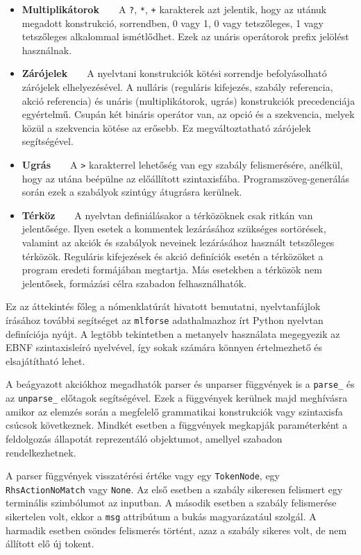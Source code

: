\documentclass[twoside, 12pt]{report}
\begin{document}
\begin{itemize}[noitemsep]
  \item \textbf{Multiplikátorok}\ \ \ \ A \verb|?|, \verb|*|, \verb|+| karakterek azt jelentik, hogy az utánuk megadott konstrukció, sorrendben, 0 vagy 1, 0 vagy tetszőleges, 1 vagy tetszőleges alkalommal ismétlődhet. Ezek az unáris operátorok prefix jelölést használnak.
  \item \textbf{Zárójelek}\ \ \ \ A nyelvtani konstrukciók kötési sorrendje befolyásolható zárójelek elhelyezésével. A nulláris (reguláris kifejezés, szabály referencia, akció referencia) és unáris (multiplikátorok, ugrás) konstrukciók precedenciája egyértelmű. Csupán két bináris operátor van, az opció és a szekvencia, melyek közül a szekvencia kötése az erősebb. Ez megváltoztatható zárójelek segítségével.
  \item \textbf{Ugrás}\ \ \ \ A \verb|>| karakterrel lehetőség van egy szabály felismerésére, anélkül, hogy az utána beépülne az előállított szintaxisfába. Programszöveg-generálás során ezek a szabályok szintúgy átugrásra kerülnek.
  \item \textbf{Térköz}\ \ \ \ A nyelvtan definiálásakor a térközöknek csak ritkán van jelentősége. Ilyen esetek a kommentek lezárásához szükséges sortörések, valamint az akciók és szabályok neveinek lezárásához használt tetszőleges térközök. Reguláris kifejezések és akció definíciók esetén a térközöket a program eredeti formájában megtartja. Más esetekben a térközök nem jelentősek, formázási célra szabadon felhasználhatók.
\end{itemize}

Ez az áttekintés főleg a nómenklatúrát hivatott bemutatni, nyelvtanfájlok írásához további segítséget az \verb|mlforse| adathalmazhoz írt Python nyelvtan definíciója nyújt. A legtöbb tekintetben a metanyelv használata megegyezik az EBNF szintaxisleíró nyelvével, így sokak számára könnyen értelmezhető és elsajátítható lehet.

A beágyazott akciókhoz megadhatók parser és unparser függvények is a \verb|parse_| és az \verb|unparse_| előtagok segítségével. Ezek a függvények kerülnek majd meghívásra amikor az elemzés során a megfelelő grammatikai konstrukciók vagy szintaxisfa csúcsok következnek. Mindkét esetben a függvények megkapják paraméterként a feldolgozás állapotát reprezentáló objektumot, amellyel szabadon rendelkezhetnek.

A parser függvények visszatérési értéke vagy egy \verb|TokenNode|, egy \verb|RhsActionNoMatch| vagy \verb|None|. Az első esetben a szabály sikeresen felismert egy terminális szimbólumot az inputban. A második esetben a szabály felismerése sikertelen volt, ekkor a \verb|msg| attribútum a bukás magyarázatául szolgál. A harmadik esetben csöndes felismerés történt, azaz a szabály sikeres volt, de nem állított elő új tokent.
\end{document}
